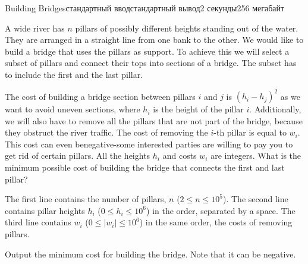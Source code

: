 \begin{problem}{Building Bridges}{стандартный ввод}{стандартный вывод}{2 секунды}{256 мегабайт}

A wide river has $n$ pillars of possibly different heights standing out of the water. They are arranged in a straight line from one bank to the other. We would like to build a bridge that uses the pillars as support. To achieve this we will select a subset of pillars and connect their tops into sections of a bridge. The subset has to include the first and the last pillar.

The cost of building a bridge section between pillars $i$ and $j$ is $(h_i - h_j)^2$ as we want to avoid uneven sections, where $h_i$ is the height of the pillar $i$. Additionally, we will also have to remove all the pillars that are not part of the bridge, because they obstruct the river traffic. The cost of removing the $i$-th pillar is equal to $w_i$. This cost can even benegative-some interested parties are willing to pay you to get rid of certain pillars. All the heights $h_i$ and costs $w_i$ are integers.
What is the minimum possible cost of building the bridge that connects the first and last pillar?

\InputFile
The first line contains the number of pillars, $n$ ($2 \leq n \leq 10^5$). The second line contains pillar heights $h_i$ ($0 \leq h_i \leq 10^6$) in the order, separated by a space. The third line contains $w_i$ ($0 \leq |w_i| \leq 10^6$) in the same order, the costs of removing pillars.

\OutputFile
Output the minimum cost for building the bridge. Note that it can be negative.

\Examples

\begin{example}
%
\end{example}

\end{problem}

